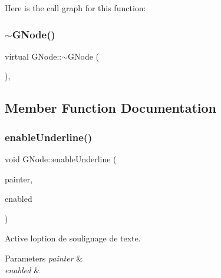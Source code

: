Here is the call graph for this function\+:
\mbox{\label{struct_g_node_a126f44e9c70024d22e3766e9188858e0}} 
\subsubsection{\texorpdfstring{$\sim$\+G\+Node()}{~GNode()}}
{\footnotesize\ttfamily virtual G\+Node\+::$\sim$\+G\+Node (\begin{DoxyParamCaption}{ }\end{DoxyParamCaption})\hspace{0.3cm}{\ttfamily [inline]}, {\ttfamily [virtual]}}



\subsection{Member Function Documentation}
\mbox{\label{struct_g_node_a1828c2a21037df0a85be72c1c65266dd}} 
\subsubsection{\texorpdfstring{enable\+Underline()}{enableUnderline()}}
{\footnotesize\ttfamily void G\+Node\+::enable\+Underline (\begin{DoxyParamCaption}\item[{Q\+Painter \&}]{painter,  }\item[{const bool \&}]{enabled }\end{DoxyParamCaption})\hspace{0.3cm}{\ttfamily [inline]}}



Active l\textquotesingle{}option de soulignage de texte. 


\begin{DoxyParams}{Parameters}
{\em painter} & \\
\hline
{\em enabled} & \\
\hline
\end{DoxyParams}
\mbox{\label{struct_g_node_a380b1efbcfae97d1746ce7f30f983742}} 

